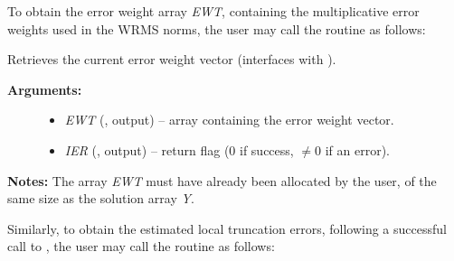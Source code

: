 \documentclass[letterpaper,10pt,english]{sphinxmanual}
\begin{document}
To obtain the error weight array \emph{EWT}, containing the
multiplicative error weights used in the WRMS norms, the user may call
the routine {\hyperref[f_interface/Optional_output:f/_/FARKGETERRWEIGHTS]{}} as follows:

\begin{fulllineitems}
\label{f_interface/Optional_output:f/_/FARKGETERRWEIGHTS}
Retrieves the current error weight vector (interfaces
with {\hyperref[c_interface/User_callable:ARKodeGetErrWeights]{}}).
\begin{description}
\item[{\textbf{Arguments:}}] \leavevmode\begin{itemize}
\item {} 
\emph{EWT} (, output) -- array containing the error
weight vector.

\item {} 
\emph{IER}  (, output) -- return flag  (0 if success,
$\ne 0$ if an error).

\end{itemize}

\end{description}

\textbf{Notes:}
The array \emph{EWT} must have already been allocated by the user, of
the same size as the solution array \emph{Y}.

\end{fulllineitems}


Similarly, to obtain the estimated local truncation errors, following
a successful call to {\hyperref[f_interface/Usage:f/_/FARKODE]{}}, the user may call the
routine {\hyperref[f_interface/Optional_output:f/_/FARKGETESTLOCALERR]{}} as follows:
\end{document}
